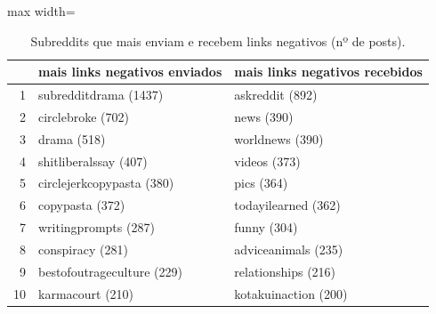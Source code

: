 \begin{table}[t]
\centering
\small
\caption{Subreddits que mais enviam e recebem links negativos (nº de posts).}
\label{tab:negativos}
\begin{adjustbox}{max width=\linewidth}
\begin{tabular}{rll}
\toprule
 & mais links negativos enviados & mais links negativos recebidos \\
\midrule
1 & subredditdrama (1437) & askreddit (892) \\
2 & circlebroke (702) & news (390) \\
3 & drama (518) & worldnews (390) \\
4 & shitliberalssay (407) & videos (373) \\
5 & circlejerkcopypasta (380) & pics (364) \\
6 & copypasta (372) & todayilearned (362) \\
7 & writingprompts (287) & funny (304) \\
8 & conspiracy (281) & adviceanimals (235) \\
9 & bestofoutrageculture (229) & relationships (216) \\
10 & karmacourt (210) & kotakuinaction (200) \\
\bottomrule
\end{tabular}
\end{adjustbox}
\end{table}
